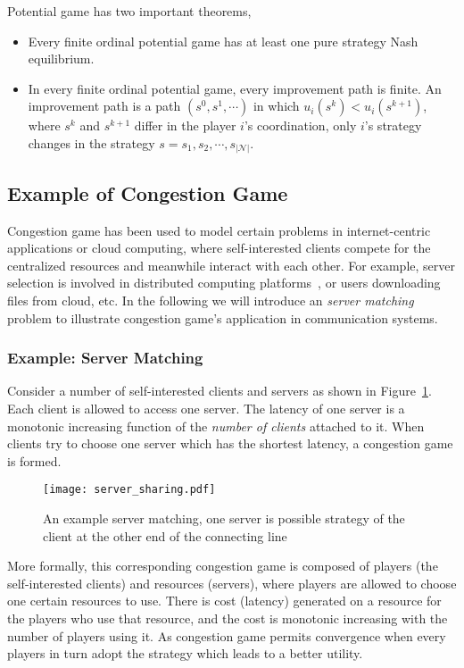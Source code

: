 Potential game has two important theorems,
\begin{itemize}
\item Every finite ordinal potential game has at least one pure strategy Nash equilibrium.
\item In every finite ordinal potential game, every improvement path is finite.
An improvement path is a path $(s^0, s^1, \cdots)$ in which $u_i(s^k) < u_i(s^{k+1}) $, where $s^k$ and $s^{k+1}$ differ in the player $i$'s coordination, \ie only $i$'s strategy changes in the strategy $s={s_1, s_2, \cdots, s_{|\mathcal{N}|}}$.

\end{itemize}

\subsection{Example of Congestion Game}
Congestion game has been used to model certain problems in internet-centric applications or cloud computing, where self-interested clients compete for the centralized resources and meanwhile interact with each other.
For example, server selection is involved in distributed computing platforms~\cite{Cloud_Computing_2010}, or users downloading files from cloud, etc.
In the following we will introduce an \textit{server matching}~\cite{kothari:congestion_serverMatching} problem to illustrate congestion game's application in communication systems.

\subsubsection*{Example: Server Matching}

Consider a number of self-interested clients and servers as shown in Figure~\ref{server_sharing}.
Each client is allowed to access one server.
The latency of one server is a monotonic increasing function of the \textit{number of clients} attached to it.
When clients try to choose one server which has the shortest latency, a congestion game is formed.
\begin{figure}[h!]
  \centering
  \texttt{[image: server\_sharing.pdf]}
  \caption{An example server matching, one server is possible strategy of the client at the other end of the connecting line}
\label{server_sharing}
\end{figure}

More formally, this corresponding congestion game is composed of players (the self-interested clients) and resources (servers), where players are allowed to choose one certain resources to use. 
There is cost (latency) generated on a resource for the players who use that resource, and the cost is monotonic increasing with the number of players using it. 
As congestion game permits convergence when every players in turn adopt the strategy which leads to a better utility.

